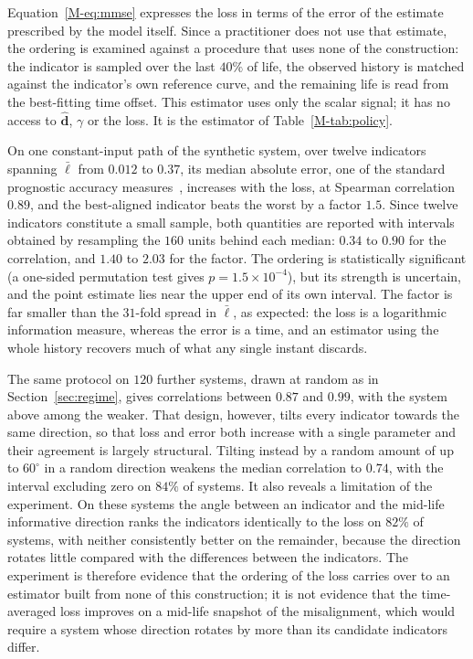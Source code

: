 \documentclass[12pt]{article}
\newcommand{\dhat}{\hat{\mathbf{d}}}
\newcommand{\lloss}{\ell}
\begin{document}
Equation~\eqref{M-eq:mmse} expresses the loss in terms of the error of the estimate prescribed by the model itself. Since a practitioner does not use that estimate, the ordering is examined against a procedure that uses none of the construction: the indicator is sampled over the last $40\%$ of life, the observed history is matched against the indicator's own reference curve, and the remaining life is read from the best-fitting time offset. This estimator uses only the scalar signal; it has no access to $\dhat$, $\gamma$ or the loss. It is the estimator of Table~\ref{M-tab:policy}.

On one constant-input path of the synthetic system, over twelve indicators spanning $\bar\lloss$ from $0.012$ to $0.37$, its median absolute error, one of the standard prognostic accuracy measures~\cite{saxena2008metrics}, increases with the loss, at Spearman correlation $0.89$, and the best-aligned indicator beats the worst by a factor $1.5$. Since twelve indicators constitute a small sample, both quantities are reported with intervals obtained by resampling the $160$ units behind each median: $0.34$ to $0.90$ for the correlation, and $1.40$ to $2.03$ for the factor. The ordering is statistically significant (a one-sided permutation test gives $p=1.5\times10^{-4}$), but its strength is uncertain, and the point estimate lies near the upper end of its own interval. The factor is far smaller than the $31$-fold spread in $\bar\lloss$, as expected: the loss is a logarithmic information measure, whereas the error is a time, and an estimator using the whole history recovers much of what any single
instant discards.

The same protocol on $120$ further systems, drawn at random as in
Section~\ref{sec:regime}, gives correlations between $0.87$ and $0.99$, with
the system above among the weaker. That design, however, tilts every indicator
towards the same direction, so that loss and error both increase with a
single parameter and their agreement is largely structural. Tilting instead
by a random amount of up to $60^{\circ}$ in a random direction weakens the
median correlation to
$0.74$, with the interval excluding zero on $84\%$ of systems. It also reveals
a limitation of the experiment. On these systems the angle between an
indicator and the mid-life informative direction ranks the indicators
identically to the loss on $82\%$ of systems, with neither consistently better
on the remainder, because the direction rotates little compared with the
differences between the indicators. The experiment is therefore evidence that
the ordering of the loss carries over to an estimator built from none of this
construction; it is not evidence that the time-averaged loss improves on a
mid-life snapshot of the misalignment, which would require a system whose
direction rotates by more than its candidate indicators differ.



\end{document}
